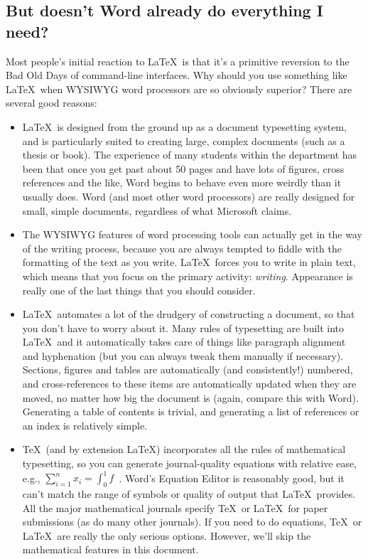 \documentclass[12pt,a4paper,pdftex]{article}
\begin{document}
\subsection{But doesn't Word already do everything I need?}
\label{sec-Word}

Most people's initial reaction to \LaTeX\ is that it's a primitive reversion to the Bad Old Days of command-line interfaces. Why should you use something like \LaTeX\ when WYSIWYG word processors are so obviously superior? There are several good reasons:

\begin{itemize}

	\item \LaTeX\ is designed from the ground up as a document typesetting system, and is particularly suited to creating large, complex documents (such as a thesis or book). The experience of many students within the department has been that once you get past about 50 pages and have lots of figures, cross references and the like, Word begins to behave even more weirdly than it usually does. Word (and most other word processors) are really designed for small, simple documents, regardless of what Microsoft claims.
	
	\item The WYSIWYG features of word processing tools can actually get in the way of the writing process, because you are always tempted to fiddle with the formatting of the text as you write. \LaTeX\ forces you to write in plain text, which means that you focus on the primary activity: \emph{writing}. Appearance is really one of the last things that you should consider.
	
	\item \LaTeX\ automates a lot of the drudgery of constructing a document, so that you don't have to worry about it. Many rules of typesetting are built into \LaTeX\, and it automatically takes care of things like paragraph alignment and hyphenation (but you can always tweak them manually if necessary). Sections, figures and tables are automatically (and consistently!) numbered, and cross-references to these items are automatically updated when they are moved, no matter how big the document is (again, compare this with Word). Generating a table of contents is trivial, and generating a list of references or an index is relatively simple.
	
	\item \TeX\ (and by extension \LaTeX) incorporates all the rules of mathematical typesetting, so you can generate journal-quality equations with relative ease, e.g., \(\sum_{i=1}^{n} x_{i} = \int_{0}^{1} f\)~\cite{UsersGuide}. Word's Equation Editor is reasonably good, but it can't match the range of symbols or quality of output that \LaTeX\ provides. All the major mathematical journals specify \TeX\ or \LaTeX\ for paper submissions (as do many other journals). If you need to do equations, \TeX\ or \LaTeX\ are really the only serious options. However, we'll skip the mathematical features in this document.
	

\end{itemize}
\end{document}
